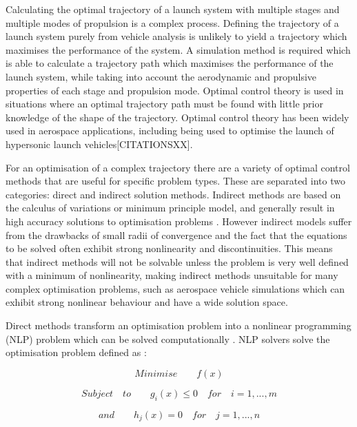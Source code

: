  Calculating the optimal trajectory of a launch system with multiple stages and multiple modes of propulsion is a complex process. 
 Defining the trajectory of a launch system purely from vehicle analysis is unlikely to yield a trajectory which maximises the performance of the system.
  A simulation method is required which is able to calculate a trajectory path which maximises the performance of the launch system, while taking into account the aerodynamic and propulsive properties of each stage and propulsion mode. 
  Optimal control theory is used in situations where an optimal trajectory path must be found with little prior knowledge of the shape of the trajectory. Optimal control theory has been widely used in aerospace applications, including being used to optimise the launch of hypersonic launch vehicles[CITATIONSXX].
  
For an optimisation of a complex trajectory there are a variety of optimal control methods that are useful for specific problem types. These are separated into two categories: direct and indirect solution methods. Indirect methods are based on the calculus of variations or minimum principle model, and generally result in high accuracy solutions to optimisation problems \cite{Bulirsch1993}. However indirect models suffer from the drawbacks of small radii of convergence and the fact that the equations to be solved often exhibit strong nonlinearity and discontinuities. This means that indirect methods will not be solvable unless the problem is very well defined with a minimum of nonlinearity, making indirect methods unsuitable for many complex optimisation problems, such as aerospace vehicle simulations which can exhibit strong nonlinear behaviour and have a wide solution space. 

Direct methods transform an optimisation problem into a nonlinear programming (NLP) problem which can be solved computationally \cite{Stryk1992}. NLP solvers solve the optimisation problem defined as \cite{Bazaraa2013}:

\begin{equation}
Minimise \qquad f(x)
\end{equation}

\begin{equation}
Subject \quad to \qquad g_i(x)\leq0 \quad for \quad i=1,...,m
\end{equation}

\begin{equation}
and \qquad h_j(x) = 0 \quad for \quad j=1,...,n
\end{equation}

